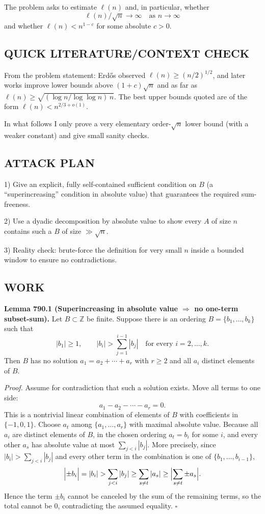 The problem asks to estimate $\ell(n)$ and, in particular, whether
\[\ell(n)/\sqrt n \to \infty\quad\text{as }n\to\infty\]
and whether $\ell(n)< n^{1-c}$ for some absolute $c>0$.

\subsection*{QUICK LITERATURE/CONTEXT CHECK}
From the problem statement: Erd\H{o}s observed $\ell(n)\ge (n/2)^{1/2}$, and later works improve lower bounds above $(1+c)\sqrt n$ and as far as $\ell(n)\ge \sqrt{(\log n/\log\log n)\,n}$. The best upper bounds quoted are of the form $\ell(n)<n^{2/3+o(1)}$.

In what follows I only prove a very elementary order-$\sqrt n$ lower bound (with a weaker constant) and give small sanity checks.

\subsection*{ATTACK PLAN}
1) Give an explicit, fully self-contained sufficient condition on $B$ (a ``superincreasing'' condition in absolute value) that guarantees the required sum-freeness.

2) Use a dyadic decomposition by absolute value to show every $A$ of size $n$ contains such a $B$ of size $\gg \sqrt n$.

3) Reality check: brute-force the definition for very small $n$ inside a bounded window to ensure no contradictions.

\subsection*{WORK}
\textbf{Lemma 790.1 (Superincreasing in absolute value $\Rightarrow$ no one-term subset-sum).}
Let $B\subset\mathbb Z$ be finite. Suppose there is an ordering $B=\{b_1,\dots,b_k\}$ such that
\[
|b_1|\ge 1,\qquad |b_{i}| > \sum_{j=1}^{i-1} |b_j|\quad\text{for every }i=2,\dots,k.
\]
Then $B$ has no solution $a_1=a_2+\cdots+a_r$ with $r\ge 2$ and all $a_i$ distinct elements of $B$.

\emph{Proof.}
Assume for contradiction that such a solution exists. Move all terms to one side:
\[
 a_1 - a_2 - \cdots - a_r = 0.
\]
This is a nontrivial linear combination of elements of $B$ with coefficients in $\{-1,0,1\}$. Choose $a_t$ among $\{a_1,\dots,a_r\}$ with maximal absolute value.
Because all $a_i$ are distinct elements of $B$, in the chosen ordering $a_t=b_i$ for some $i$, and every other $a_s$ has absolute value at most $\sum_{j<i}|b_j|$.
More precisely, since $|b_i|>\sum_{j<i}|b_j|$ and every other term in the combination is one of $\{b_1,\dots,b_{i-1}\}$,
\[
\Bigl|\pm b_i\Bigr| = |b_i| > \sum_{j<i}|b_j| \ge \sum_{\substack{s\ne t}} |a_s| \ge \Bigl|\sum_{\substack{s\ne t}} \pm a_s\Bigr|.
\]
Hence the term $\pm b_i$ cannot be canceled by the sum of the remaining terms, so the total cannot be $0$, contradicting the assumed equality. \hfill$\square$

